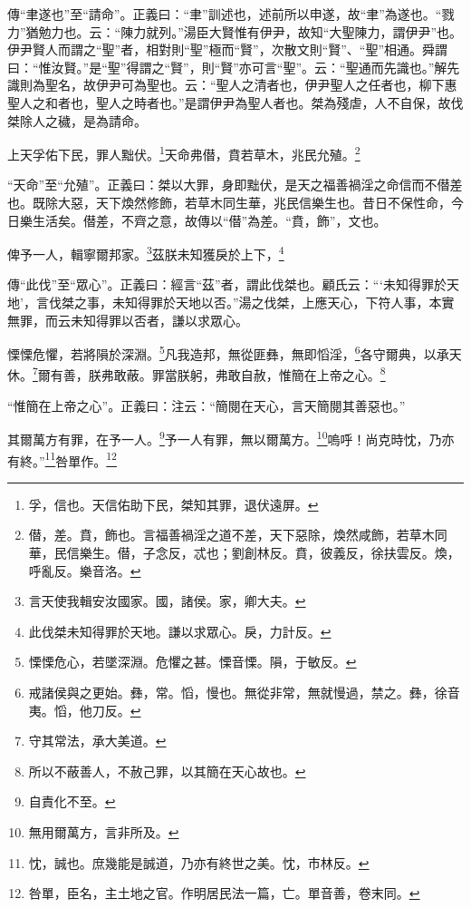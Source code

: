 {\noindent\shu{}\fzkt 傳“聿遂也”至“請命”。正義曰：“聿”訓述也，述前所以申遂，故“聿”為遂也。“戮力”猶勉力也。云：“陳力就列。”湯臣大賢惟有伊尹，故知“大聖陳力，謂伊尹”也。伊尹賢人而謂之“聖”者，相對則“聖”極而“賢”，次散文則“賢”、“聖”相通。舜謂曰：“惟汝賢。”是“聖”得謂之“賢”，則“賢”亦可言“聖”。云：“聖通而先識也。”解先識則為聖名，故伊尹可為聖也。云：“聖人之清者也，伊尹聖人之任者也，柳下惠聖人之和者也，聖人之時者也。”是謂伊尹為聖人者也。桀為殘虐，人不自保，故伐桀除人之穢，是為請命。 \par}

上天孚佑下民，罪人黜伏。\footnote{孚，信也。天信佑助下民，桀知其罪，退伏遠屏。}天命弗僣，賁若草木，兆民允殖。\footnote{僣，差。賁，飾也。言福善禍淫之道不差，天下惡除，煥然咸飾，若草木同華，民信樂生。僣，子念反，忒也；劉創林反。賁，彼義反，徐扶雲反。煥，呼亂反。樂音洛。}

{\noindent\shu{}\fzkt “天命”至“允殖”。正義曰：桀以大罪，身即黜伏，是天之福善禍淫之命信而不僣差也。既除大惡，天下煥然修飾，若草木同生華，兆民信樂生也。昔日不保性命，今日樂生活矣。僣差，不齊之意，故傳以“僣”為差。“賁，飾”，文也。 \par}

俾予一人，輯寧爾邦家。\footnote{言天使我輯安汝國家。國，諸侯。家，卿大夫。}茲朕未知獲戾於上下，\footnote{此伐桀未知得罪於天地。謙以求眾心。戾，力計反。}

{\noindent\shu{}\fzkt 傳“此伐”至“眾心”。正義曰：經言“茲”者，謂此伐桀也。顧氏云：“‘未知得罪於天地’，言伐桀之事，未知得罪於天地以否。”湯之伐桀，上應天心，下符人事，本實無罪，而云未知得罪以否者，謙以求眾心。 \par}

慄慄危懼，若將隕於深淵。\footnote{慄慄危心，若墜深淵。危懼之甚。慄音慄。隕，于敏反。}凡我造邦，無從匪彝，無即慆淫，\footnote{戒諸侯與之更始。彝，常。慆，慢也。無從非常，無就慢過，禁之。彝，徐音夷。慆，他刀反。}各守爾典，以承天休。\footnote{守其常法，承大美道。}爾有善，朕弗敢蔽。罪當朕躬，弗敢自赦，惟簡在上帝之心。\footnote{所以不蔽善人，不赦己罪，以其簡在天心故也。}

{\noindent\shu{}\fzkt “惟簡在上帝之心”。正義曰：注云：“簡閱在天心，言天簡閱其善惡也。” \par}

其爾萬方有罪，在予一人。\footnote{自責化不至。}予一人有罪，無以爾萬方。\footnote{無用爾萬方，言非所及。}嗚呼！尚克時忱，乃亦有終。”\footnote{忱，誠也。庶幾能是誠道，乃亦有終世之美。忱，市林反。}咎單作。\footnote{咎單，臣名，主土地之官。作明居民法一篇，亡。單音善，卷末同。}

